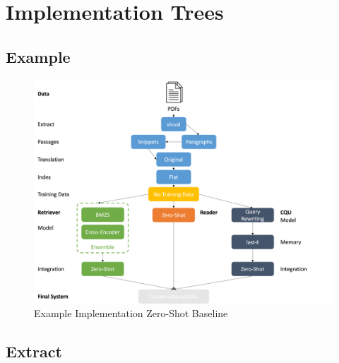 \section{Implementation Trees}
\label{ref:appendixA-implementation}

\subsection{Example}

\begin{figure}
    \centering
    \includegraphics[width=\textwidth]{Grafiken/example_decission_tree.png}
    \caption{Example Implementation Zero-Shot Baseline}
    \label{fig:example-implementation-tree}
\end{figure}

\subsection{Extract}
